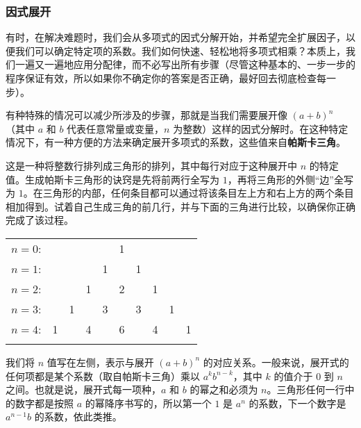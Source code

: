 \subsubsection*{因式展开}

有时，在解决难题时，我们会从多项式的因式分解开始，并希望完全扩展因子，以便我们可以确定特定项的系数。我们如何快速、轻松地将多项式相乘？本质上，我们一遍又一遍地应用分配律，而不必写出所有步骤（尽管这种基本的、一步一步的程序保证有效，所以如果你不确定你的答案是否正确，最好回去彻底检查每一步）。

有种特殊的情况可以减少所涉及的步骤，那就是当我们需要展开像 $(a+b)^n$ （其中 $a$ 和 $b$ 代表任意常量或变量，$n$ 为整数）这样的因式分解时。在这种特定情况下，有一种方便的方法来确定展开多项式的系数，这些值来自\textbf{帕斯卡三角}。

这是一种将整数行排列成三角形的排列，其中每行对应于这种展开中 $n$ 的特定值。生成帕斯卡三角形的诀窍是先将前两行全写为 $1$，再将三角形的外侧“边”全写为 $1$。在三角形的内部，任何条目都可以通过将该条目左上方和右上方的两个条目相加得到。试着自己生成三角的前几行，并与下面的三角进行比较，以确保你正确完成了该过程。

\begin{center}
    \begin{tabular}{rccccccccc}
        $n=0$: &    &    &    &    &  1\\\noalign{\smallskip\smallskip}
        $n=1$: &    &    &    &  1 &    &  1\\\noalign{\smallskip\smallskip}
        $n=2$: &    &    &  1 &    &  2 &    &  1\\\noalign{\smallskip\smallskip}
        $n=3$: &    &  1 &    &  3 &    &  3 &    &  1\\\noalign{\smallskip\smallskip}
        $n=4$: &  1 &    &  4 &    &  6 &    &  4 &    &  1\\\noalign{\smallskip\smallskip}
    \end{tabular}
\end{center}

我们将 $n$ 值写在左侧，表示与展开 $(a+b)^n$ 的对应关系。一般来说，展开式的任何项都是某个系数（取自帕斯卡三角）乘以 $a^kb^{n-k}$，其中 $k$ 的值介于 $0$ 到 $n$ 之间。也就是说，展开式每一项种，$a$ 和 $b$ 的幂之和必须为 $n$。三角形任何一行中的数字都是按照 $a$ 的幂降序书写的，所以第一个 $1$ 是 $a^n$ 的系数，下一个数字是 $a^{n-1}b$ 的系数，依此类推。

